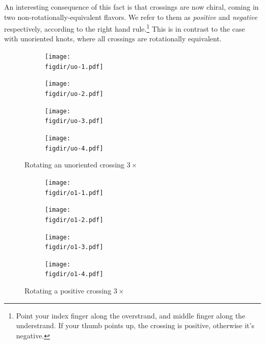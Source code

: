 An interesting consequence of this fact is that crossings are now
chiral, coming in two non-rotationally-equivalent flavors. We refer to
them as \emph{positive} and \emph{negative} respectively, according to
the right hand rule.\footnote{Point your index finger along the
  overstrand, and middle finger along the understrand. If your thumb
  points up, the crossing is positive, otherwise it's negative.} This
is in contrast to the case with unoriented knots, where all crossings
are rotationally equivalent.
\begin{figure}[H]
  \def\figdir{figures/fundamentals/crossings}
  \centering
  \begin{subfigure}{.24\textwidth}
    \texttt{[image: \\figdir/uo-1.pdf]}
  \end{subfigure}
  \begin{subfigure}{.24\textwidth}
    \texttt{[image: \\figdir/uo-2.pdf]}
  \end{subfigure}
  \begin{subfigure}{.24\textwidth}
    \texttt{[image: \\figdir/uo-3.pdf]}
  \end{subfigure}
  \begin{subfigure}{.24\textwidth}
    \texttt{[image: \\figdir/uo-4.pdf]}
  \end{subfigure}
  \caption{Rotating an unoriented crossing $3\times$}
\end{figure}
\begin{figure}[H]
  \def\figdir{figures/fundamentals/crossings}
  \centering
  \begin{subfigure}{.24\textwidth}
    \texttt{[image: \\figdir/o1-1.pdf]}
  \end{subfigure}
  \begin{subfigure}{.24\textwidth}
    \texttt{[image: \\figdir/o1-2.pdf]}
  \end{subfigure}
  \begin{subfigure}{.24\textwidth}
    \texttt{[image: \\figdir/o1-3.pdf]}
  \end{subfigure}
  \begin{subfigure}{.24\textwidth}
    \texttt{[image: \\figdir/o1-4.pdf]}
  \end{subfigure}
  \caption{Rotating a positive crossing $3\times$}
\end{figure}
